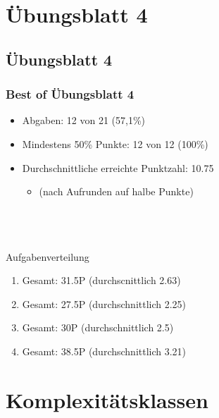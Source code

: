 




\section{Übungsblatt 4}
\subsection{Übungsblatt 4}

\begin{frame}
\frametitle{Best of Übungsblatt 4}
\begin{itemize}
	\item Abgaben: 12 von 21 (57,1\%)
	\item Mindestens 50\% Punkte: 12 von 12 (100\%)
	\item Durchschnittliche erreichte Punktzahl: 10.75
	\begin{itemize}
		\item (nach Aufrunden auf halbe Punkte)
	\end{itemize}
\end{itemize}~\\~\\~\\
Aufgabenverteilung
\begin{enumerate}[{A}ufg{a}be 1:]
	\item Gesamt: 31.5P (durchscnittlich 2.63)
	\item Gesamt: 27.5P (durchschnittlich 2.25)
	\item Gesamt: 30P (durchschnittlich 2.5)
	\item Gesamt: 38.5P (durchschnittlich 3.21)
\end{enumerate}
\end{frame}

\section{Komplexitätsklassen}

